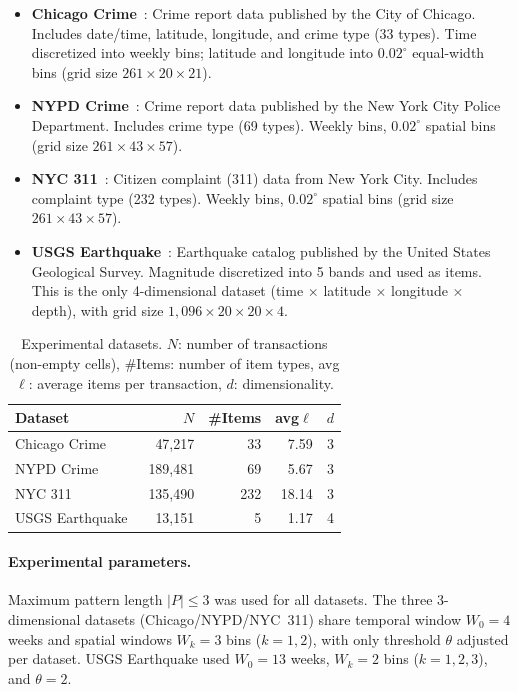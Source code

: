 \begin{itemize}
\item \textbf{Chicago Crime}~\cite{chicagocrime}:
  Crime report data published by the City of Chicago.
  Includes date/time, latitude, longitude,
  and crime type (33 types).
  Time discretized into weekly bins;
  latitude and longitude into $0.02^\circ$ equal-width bins
  (grid size $261 \times 20 \times 21$).
\item \textbf{NYPD Crime}~\cite{nypdcrime}:
  Crime report data published by the New York City Police Department.
  Includes crime type (69 types).
  Weekly bins, $0.02^\circ$ spatial bins
  (grid size $261 \times 43 \times 57$).
\item \textbf{NYC 311}~\cite{nyc311}:
  Citizen complaint (311) data from New York City.
  Includes complaint type (232 types).
  Weekly bins, $0.02^\circ$ spatial bins
  (grid size $261 \times 43 \times 57$).
\item \textbf{USGS Earthquake}~\cite{usgseq}:
  Earthquake catalog published by the United States Geological Survey.
  Magnitude discretized into 5 bands and used as items.
  This is the only 4-dimensional dataset
  (time $\times$ latitude $\times$ longitude $\times$ depth),
  with grid size $1{,}096 \times 20 \times 20 \times 4$.
\end{itemize}

\begin{table}[h]
\centering
\caption{Experimental datasets.
$N$: number of transactions (non-empty cells),
\#Items: number of item types,
avg$\ell$: average items per transaction,
$d$: dimensionality.}
\label{tab:datasets}
\small
\begin{tabular}{lrrrr}
\toprule
Dataset & $N$ & \#Items & avg$\ell$ & $d$ \\
\midrule
Chicago Crime~\cite{chicagocrime}  &  47,217 &  33 &  7.59 & 3 \\
NYPD Crime~\cite{nypdcrime}        & 189,481 &  69 &  5.67 & 3 \\
NYC 311~\cite{nyc311}              & 135,490 & 232 & 18.14 & 3 \\
USGS Earthquake~\cite{usgseq}      &  13,151 &   5 &  1.17 & 4 \\
\bottomrule
\end{tabular}
\end{table}

\paragraph{Experimental parameters.}
Maximum pattern length $|P| \leq 3$ was used for all datasets.
The three 3-dimensional datasets (Chicago/NYPD/NYC~311) share
temporal window $W_0 = 4$ weeks and spatial windows $W_k = 3$ bins
($k = 1, 2$), with only threshold $\theta$ adjusted per dataset.
USGS Earthquake used $W_0 = 13$ weeks, $W_k = 2$ bins ($k = 1,2,3$),
and $\theta = 2$.

